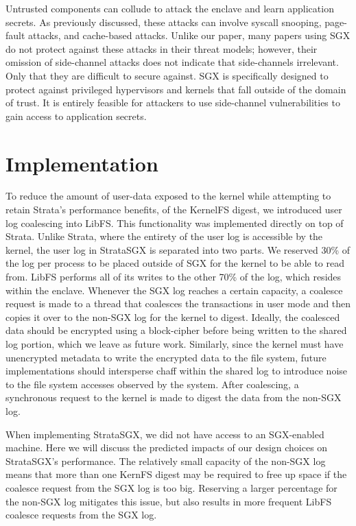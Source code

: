 \documentclass[letterpaper,twocolumn,10pt]{article}
\begin{document}
Untrusted components can collude to attack the enclave and learn application
secrets. As previously discussed, these attacks can involve syscall snooping,
page-fault attacks, and cache-based attacks. Unlike our paper, many papers
using SGX do not protect against these attacks in their threat models; however,
their omission of side-channel attacks does not indicate that side-channels
irrelevant. Only that they are difficult to secure against.  SGX is
specifically designed to protect against privileged hypervisors and kernels
that fall outside of the domain of trust.  It is entirely feasible for
attackers to use side-channel vulnerabilities to gain access to application
secrets.

\section{Implementation}

To reduce the amount of user-data exposed
to the kernel while attempting to retain Strata's performance benefits, %
of the KernelFS digest, we introduced user log coalescing into LibFS.  This
functionality was implemented directly on top of Strata. 
Unlike Strata, where the entirety of the user log is accessible
by the kernel, the user log in StrataSGX is separated into two parts.
We reserved 30\% of the log per process to be placed outside of SGX for the kernel 
to be able to read from. LibFS performs all of its writes to the other 70\% of the 
log, which resides within the enclave.
Whenever the SGX log reaches a certain capacity, a coalesce request is made to a 
thread that coalesces the transactions in user mode and then copies it over to the 
non-SGX log for the kernel to digest. 
Ideally, the coalesced data should be encrypted using a block-cipher before being 
written to the shared log portion, which we leave as future work. Similarly, since
the kernel must have unencrypted metadata to write the encrypted data to the
file system, future implementations should intersperse chaff within the shared log 
to introduce noise to the file system accesses observed by the system. 
After coalescing, a synchronous request to the kernel is made to digest the 
data from the non-SGX log. 

When implementing StrataSGX, we did not have access to an SGX-enabled machine.
Here we will discuss the predicted impacts of our design choices on
StrataSGX's performance. 
The relatively small capacity of the non-SGX log means that more than one KernFS 
digest may be required to free up space if the coalesce request from the SGX log is 
too big. Reserving a larger percentage for the non-SGX log mitigates this issue, 
but also results in more frequent LibFS coalesce requests from the SGX log. 
\end{document}
